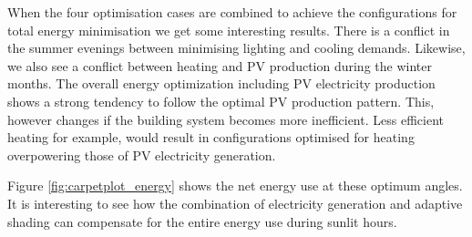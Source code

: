 When the four optimisation cases are combined to achieve the configurations for total energy minimisation we get some interesting results. There is a conflict in the summer evenings between minimising lighting and cooling demands. Likewise, we also see a conflict between heating and PV production during the winter months. The overall energy optimization including PV electricity production shows a strong tendency to follow the optimal PV production pattern. This, however changes if the building system becomes more inefficient. Less efficient heating for example, would result in configurations optimised for heating overpowering those of PV electricity generation.


Figure \ref{fig:carpetplot_energy} shows the net energy use at these optimum angles. It is interesting to see how the combination of electricity generation and adaptive shading can compensate for the entire energy use during sunlit hours.

